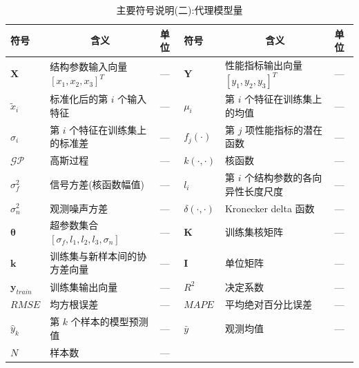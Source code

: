 \begin{table}[H]
\centering
\small
\setlength{\tabcolsep}{2.5pt}
\caption{主要符号说明(二):代理模型量}
\begin{tabular}{>{\centering\arraybackslash}p{1.4cm}p{4.6cm}>{\centering\arraybackslash}p{1.2cm}>{\centering\arraybackslash}p{1.4cm}p{4.6cm}>{\centering\arraybackslash}p{1.2cm}}
\toprule
符号 & \multicolumn{1}{c}{含义} & 单位 & 符号 & \multicolumn{1}{c}{含义} & 单位 \\
\midrule
$\mathbf{X}$    & 结构参数输入向量 $[x_1, x_2, x_3]^T$ & — & $\mathbf{Y}$ & 性能指标输出向量 $[y_1, y_2, y_3]^T$ & — \\
$\tilde{x}_i$   & 标准化后的第 $i$ 个输入特征 & — & $\mu_i$      & 第 $i$ 个特征在训练集上的均值 & — \\
$\sigma_i$      & 第 $i$ 个特征在训练集上的标准差 & — & $f_j(\cdot)$ & 第 $j$ 项性能指标的潜在函数 & — \\
$\mathcal{GP}$  & 高斯过程 & — & $k(\cdot, \cdot)$ & 核函数 & — \\
$\sigma_f^2$    & 信号方差(核函数幅值) & — & $l_i$        & 第 $i$ 个结构参数的各向异性长度尺度 & — \\
$\sigma_n^2$    & 观测噪声方差 & — & $\delta(\cdot, \cdot)$ & Kronecker delta 函数 & — \\
$\boldsymbol{\theta}$ & 超参数集合 $[\sigma_f, l_1, l_2, l_3, \sigma_n]$ & — & $\mathbf{K}$ & 训练集核矩阵 & — \\
$\mathbf{k}$    & 训练集与新样本间的协方差向量 & — & $\mathbf{I}$ & 单位矩阵 & — \\
$\mathbf{y}_{train}$ & 训练集输出向量 & — & $R^2$        & 决定系数 & — \\
$RMSE$          & 均方根误差 & — & $MAPE$       & 平均绝对百分比误差 & — \\
$\hat{y}_k$     & 第 $k$ 个样本的模型预测值 & — & $\bar{y}$    & 观测均值 & — \\
$N$             & 样本数 & — & \multicolumn{3}{l}{} \\
\bottomrule
\end{tabular}
\end{table}


